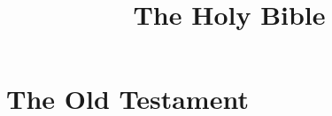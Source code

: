 \documentclass[twoside,twocolumn,a4paper,10pt]{memoir}
\title{The Holy Bible}
\date{}
\author{}
\begin{document}
\frontmatter
\maketitle
\tableofcontents

\mainmatter
\part*{The Old Testament}
  \setlength{\columnseprule}{.5pt}


\end{document}
